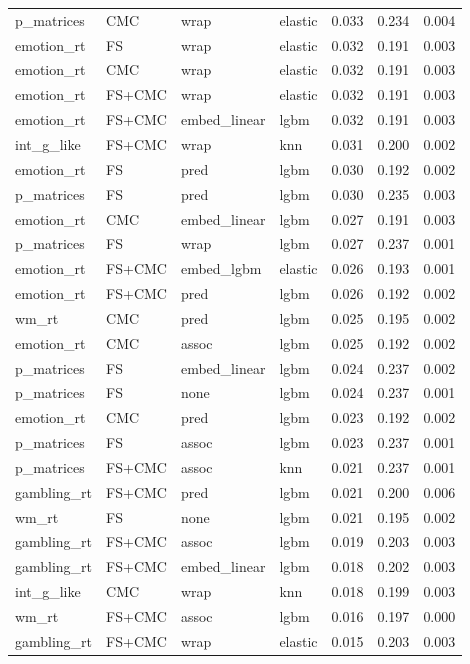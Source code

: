 \documentclass{article}
\begin{document}
\begin{table}
\begin{tabular}{llllrrr}
	p\_matrices & CMC & wrap & elastic & 0.033 & 0.234 & 0.004 \\
	emotion\_rt & FS & wrap & elastic & 0.032 & 0.191 & 0.003 \\
	emotion\_rt & CMC & wrap & elastic & 0.032 & 0.191 & 0.003 \\
	emotion\_rt & FS+CMC & wrap & elastic & 0.032 & 0.191 & 0.003 \\
	emotion\_rt & FS+CMC & embed\_linear & lgbm & 0.032 & 0.191 & 0.003 \\
	int\_g\_like & FS+CMC & wrap & knn & 0.031 & 0.200 & 0.002 \\
	emotion\_rt & FS & pred & lgbm & 0.030 & 0.192 & 0.002 \\
	p\_matrices & FS & pred & lgbm & 0.030 & 0.235 & 0.003 \\
	emotion\_rt & CMC & embed\_linear & lgbm & 0.027 & 0.191 & 0.003 \\
	p\_matrices & FS & wrap & lgbm & 0.027 & 0.237 & 0.001 \\
	emotion\_rt & FS+CMC & embed\_lgbm & elastic & 0.026 & 0.193 & 0.001 \\
	emotion\_rt & FS+CMC & pred & lgbm & 0.026 & 0.192 & 0.002 \\
	wm\_rt & CMC & pred & lgbm & 0.025 & 0.195 & 0.002 \\
	emotion\_rt & CMC & assoc & lgbm & 0.025 & 0.192 & 0.002 \\
	p\_matrices & FS & embed\_linear & lgbm & 0.024 & 0.237 & 0.002 \\
	p\_matrices & FS & none & lgbm & 0.024 & 0.237 & 0.001 \\
	emotion\_rt & CMC & pred & lgbm & 0.023 & 0.192 & 0.002 \\
	p\_matrices & FS & assoc & lgbm & 0.023 & 0.237 & 0.001 \\
	p\_matrices & FS+CMC & assoc & knn & 0.021 & 0.237 & 0.001 \\
	gambling\_rt & FS+CMC & pred & lgbm & 0.021 & 0.200 & 0.006 \\
	wm\_rt & FS & none & lgbm & 0.021 & 0.195 & 0.002 \\
	gambling\_rt & FS+CMC & assoc & lgbm & 0.019 & 0.203 & 0.003 \\
	gambling\_rt & FS+CMC & embed\_linear & lgbm & 0.018 & 0.202 & 0.003 \\
	int\_g\_like & CMC & wrap & knn & 0.018 & 0.199 & 0.003 \\
	wm\_rt & FS+CMC & assoc & lgbm & 0.016 & 0.197 & 0.000 \\
	gambling\_rt & FS+CMC & wrap & elastic & 0.015 & 0.203 & 0.003 \\

\end{tabular}
\end{table}
\end{document}
